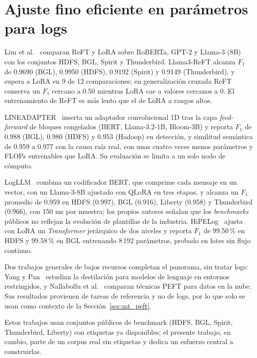 \section{Ajuste fino eficiente en parámetros para logs}\label{sec:tr_peft}

Lim et al.~\cite{lim2025_logadreft} comparan ReFT y LoRA sobre RoBERTa, GPT-2 y Llama-3 (8B) con los conjuntos HDFS, BGL, Spirit y Thunderbird. Llama3-ReFT alcanza $F_1$ de 0.9690 (BGL), 0.9950 (HDFS), 0.9192 (Spirit) y 0.9149 (Thunderbird), y supera a LoRA en 9 de 12 comparaciones; en generalización cruzada ReFT conserva un $F_1$ cercano a 0.50 mientras LoRA cae a valores cercanos a 0. El entrenamiento de ReFT es más lento que el de LoRA a rangos altos.

LINEADAPTER~\cite{liu2025_lineadapter} inserta un adaptador convolucional 1D tras la capa \textit{feed-forward} de bloques congelados (BERT, Llama-3.2-1B, Bloom-3B) y reporta $F_1$ de 0.988 (BGL), 0.980 (HDFS) y 0.953 (Hadoop) en detección, y similitud semántica de 0.959 a 0.977 con la causa raíz real, con unas cuatro veces menos parámetros y FLOPs entrenables que LoRA. Su evaluación se limita a un solo nodo de cómputo.

LogLLM~\cite{guan2024_logllm} combina un codificador BERT, que comprime cada mensaje en un vector, con un Llama-3-8B ajustado con QLoRA en tres etapas, y alcanza un $F_1$ promedio de 0.959 en HDFS (0.997), BGL (0.916), Liberty (0.958) y Thunderbird (0.966), con 150 ms por muestra; los propios autores señalan que los \textit{benchmarks} públicos no reflejan la evolución de plantillas de la industria. HiPELog~\cite{devi2026_hipelog} ajusta con LoRA un \textit{Transformer} jerárquico de dos niveles y reporta $F_1$ de 99.50\,\% en HDFS y 99.58\,\% en BGL entrenando 8\,192 parámetros, probado en lotes sin flujo continuo.

Dos trabajos generales de bajos recursos completan el panorama, sin tratar logs: Yang y Pan~\cite{yang2025_lightweight} estudian la destilación para modelos de lenguaje en entornos restringidos, y Nallabollu et al.~\cite{nallabollu2026_peft_cloud} comparan técnicas PEFT para datos en la nube. Sus resultados provienen de tareas de referencia y no de logs, por lo que solo se usan como contexto de la Sección~\ref{sec:mt_peft}.

Estos trabajos usan conjuntos públicos de benchmark (HDFS, BGL, Spirit, Thunderbird, Liberty) con etiquetas ya disponibles; el presente trabajo, en cambio, parte de un corpus real sin etiquetas y dedica un esfuerzo central a construirlas.

